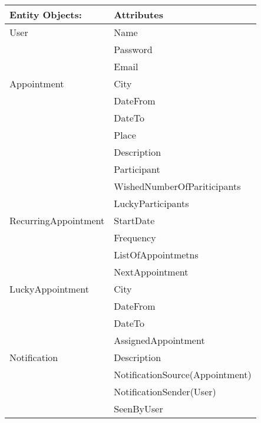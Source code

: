 {\tabulinesep=1.2mm
\begin{tabu}{ | p{3cm} | p{6cm} |}
    \hline
    \textbf{Entity Objects:}& 		\textbf{Attributes}  \\ \hline
    User 			        & 		Name          \\
                            &       Password       \\
                            &       Email         \\ \hline
    Appointment             &       City          \\
                            &       DateFrom      \\
                            &       DateTo        \\ 
                            &       Place         \\ 
                            &       Description         \\ 
                            &       Participant         \\ 
                            &       WishedNumberOfPariticipants         \\ 
                            &       LuckyParticipants \\\hline 
    RecurringAppointment    &       StartDate \\
                            &       Frequency \\
                            &       ListOfAppointmetns \\
                            &       NextAppointment \\ \hline
    LuckyAppointment        &       City          \\
                            &       DateFrom      \\
                            &       DateTo        \\ 
                            &       AssignedAppointment\\\hline
    Notification            &       Description\\
                            &       NotificationSource(Appointment)\\
                            &       NotificationSender(User)\\
                            &       SeenByUser\\\hline
\end{tabu}
}
